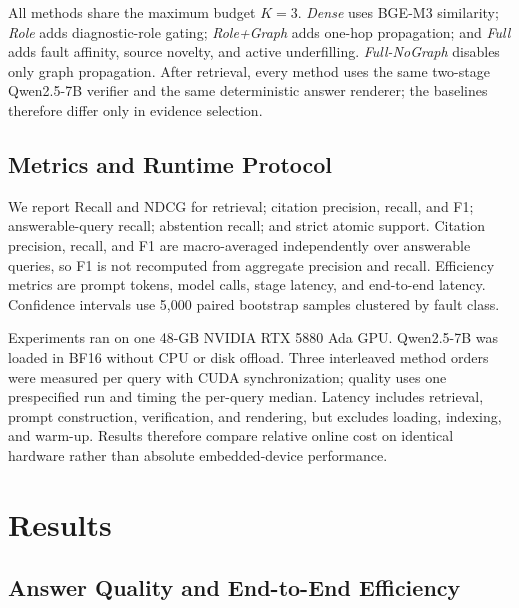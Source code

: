 \documentclass[conference]{IEEEtran}
\begin{document}
All methods share the maximum budget $K=3$. \emph{Dense} uses BGE-M3 similarity; \emph{Role} adds diagnostic-role gating; \emph{Role+Graph} adds one-hop propagation; and \emph{Full} adds fault affinity, source novelty, and active underfilling. \emph{Full-NoGraph} disables only graph propagation. After retrieval, every method uses the same two-stage Qwen2.5-7B verifier and the same deterministic answer renderer; the baselines therefore differ only in evidence selection.

\subsection{Metrics and Runtime Protocol}

We report Recall and NDCG for retrieval; citation precision, recall, and F1; answerable-query recall; abstention recall; and strict atomic support. Citation precision, recall, and F1 are macro-averaged independently over answerable queries, so F1 is not recomputed from aggregate precision and recall. Efficiency metrics are prompt tokens, model calls, stage latency, and end-to-end latency. Confidence intervals use 5,000 paired bootstrap samples clustered by fault class.

Experiments ran on one 48-GB NVIDIA RTX 5880 Ada GPU. Qwen2.5-7B was loaded in BF16 without CPU or disk offload. Three interleaved method orders were measured per query with CUDA synchronization; quality uses one prespecified run and timing the per-query median. Latency includes retrieval, prompt construction, verification, and rendering, but excludes loading, indexing, and warm-up. Results therefore compare relative online cost on identical hardware rather than absolute embedded-device performance.

\section{Results}

\subsection{Answer Quality and End-to-End Efficiency}

\begin{table}[H]
\centering
\caption{Equal-budget results with maximum $K=3$}
\label{tab:main}
\setlength{\tabcolsep}{2.4pt}
\end{table}
\end{document}
